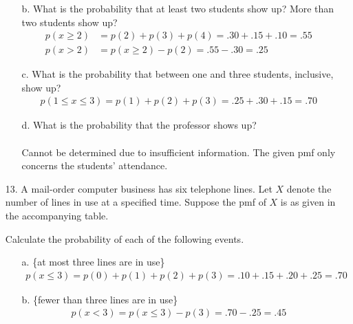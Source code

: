 \documentclass[letterpaper,12pt]{article}
\begin{document}
\begin{enumerate}
\begin{enumerate}
\begin{center}
\begin{tikzpicture}
          \end{tikzpicture}
        \end{center}
      \item[b.]
        What is the probability that at least two students show up? More than two students show up?
        \begin{align*}
          p(x \ge 2) &= p(2) + p(3) + p(4) = .30 + .15 + .10 = .55 \\
          p(x > 2) &= p(x \ge 2) - p(2) = .55 - .30 = .25
        \end{align*}
      \item[c.]
        What is the probability that between one and three students, inclusive, show up?
        \begin{align*}
          p(1 \le x \le 3) = p(1) + p(2) + p(3) = .25 + .30 + .15 = .70
        \end{align*}
      \item[d.]
        What is the probability that the professor shows up?
        \\ \\
        Cannot be determined due to insufficient information. The given pmf only concerns the students' attendance.
    \end{enumerate}
  \item[13.]
    A mail-order computer business has six telephone lines. Let $X$ denote the number of lines in use at a specified time. Suppose the pmf of $X$ is as given in the accompanying table.
    \begin{center}
    \end{center}
    Calculate the probability of each of the following events.
    \begin{enumerate}
      \item[a.]
        \{at most three lines are in use\}
        \begin{align*}
          p(x \le 3) = p(0) + p(1) + p(2) + p(3) = .10 + .15 + .20 + .25 = .70
        \end{align*}
      \item[b.]
        \{fewer than three lines are in use\}
        \begin{align*}
          p(x < 3) = p(x \le 3) - p(3) = .70 - .25 = .45

\end{align*}
\end{enumerate}
\end{enumerate}
\end{document}
